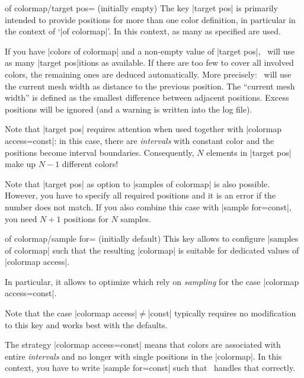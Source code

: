 {\begin{enumerate}
\begin{pgfplotskey}{of colormap/target pos= (initially empty)}
	The key |target pos| is primarily intended to provide positions for more than one color definition, in particular in the context of `|of colormap|'. In this context, as many  as specified are used. 
	
	If you have |colors of colormap| and a non-empty value of |target pos|, \PGFPlots\ will use as many |target pos|itions as available. If there are too few to cover all involved colors, the remaining ones are deduced automatically. 
	More precisely: \PGFPlots\ will use the current mesh width as distance to the previous position. The ``current mesh width'' is defined as the smallest difference between adjacent positions.
	Excess positions will be ignored (and a warning is written into the log file).

	Note that |target pos| requires attention when used together with |colormap access=const|: in this case, there are \emph{intervals} with constant color and the positions become interval boundaries. Consequently, $N$ elements in |target pos| make up $N-1$ different colors!

	Note that |target pos| as option to |samples of colormap| is also possible. However, you have to specify all required positions and it is an error if the number does not match. If you also combine this case with |sample for=const|, you need $N+1$ positions for $N$ samples. 

\end{pgfplotskey}

\begin{pgfplotskey}{of colormap/sample for= (initially default)}
	This key allows to configure |samples of colormap| such that the resulting |colormap| is suitable for dedicated values of |colormap access|. 

	In particular, it allows to optimize  which rely on \emph{sampling} for the case |colormap access=const|.

	Note that the case |colormap access|$\neq$|const| typically requires no modification to this key and works best with the defaults.

	The strategy |colormap access=const| means that colors are associated with entire \emph{intervals} and no longer with single positions in the |colormap|. In this context, you have to write |sample for=const| such that \PGFPlots\ handles that correctly.
	

\end{pgfplotskey}
\end{enumerate}}
